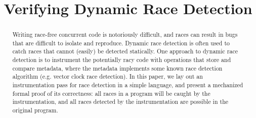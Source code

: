 \documentclass[preprint, 10pt]{sigplanconf}
\newcommand{\ignore}[1]{}
\begin{document}
\setlength{\pdfpageheight}{\paperheight}
\setlength{\pdfpagewidth}{\paperwidth}





\titlebanner{}        %
\preprintfooter{}   %

\title{Verifying Dynamic Race Detection}
\ignore{\authorinfo{William Mansky \and Yuanfeng Peng \and Steve Zdancewic \and Joseph Devietti}
           {University of Pennsylvania}
           {wmansky@seas.upenn.edu, yuanfeng@cis.upenn.edu, stevez@cis.upenn.edu, devietti@cis.upenn.edu}}
\authorinfo{}{}{}
\maketitle

\begin{abstract}
Writing race-free concurrent code is notoriously difficult, and races can result in bugs that are difficult to isolate and reproduce. Dynamic race detection is often used to catch races that cannot (easily) be detected statically. One approach to dynamic race detection is to instrument the potentially racy code with operations that store and compare metadata, where the metadata implements some known race detection algorithm (e.g. vector clock race detection). In this paper, we lay out an instrumentation pass for race detection in a simple language, and present a mechanized formal proof of its correctness: all races in a program will be caught by the instrumentation, and all races detected by the instrumentation are possible in the original program.
\end{abstract}


\end{document}
